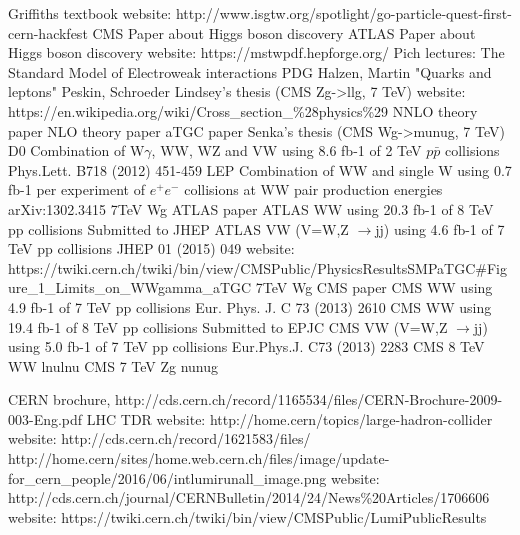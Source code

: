 \begin{thebibliography}{1}
 Griffiths textbook
 website: http://www.isgtw.org/spotlight/go-particle-quest-first-cern-hackfest
 CMS Paper about Higgs boson discovery
 ATLAS Paper about Higgs boson discovery
 website: https://mstwpdf.hepforge.org/
 Pich lectures: The Standard Model of Electroweak interactions
 PDG
 Halzen, Martin "Quarks and leptons"
 Peskin, Schroeder
 Lindsey's thesis (CMS Zg->llg, 7 TeV)
 website: https://en.wikipedia.org/wiki/Cross\_section\_\%28physics\%29
 NNLO theory paper
 NLO theory paper
 aTGC paper
 Senka's thesis (CMS Wg->munug, 7 TeV)
 D0 Combination of W$\gamma$, WW, WZ and VW using 8.6 fb-1 of 2 TeV $p\bar{p}$ collisions Phys.Lett. B718 (2012) 451-459 
 LEP Combination of WW and single W using 0.7 fb-1 per experiment of $e^+e^-$ collisions at WW pair production energies arXiv:1302.3415
 7TeV Wg ATLAS paper
 ATLAS WW using 20.3 fb-1 of 8 TeV pp collisions Submitted to JHEP
 ATLAS VW (V=W,Z $\rightarrow$jj) using 4.6 fb-1 of 7 TeV pp collisions JHEP 01 (2015) 049
 website: https://twiki.cern.ch/twiki/bin/view/CMSPublic/PhysicsResultsSMPaTGC\#Figure\_1\_Limits\_on\_WWgamma\_aTGC
 7TeV Wg CMS paper
 CMS WW using 4.9 fb-1 of 7 TeV pp collisions Eur. Phys. J. C 73 (2013) 2610
 CMS WW using 19.4 fb-1 of 8 TeV pp collisions Submitted to EPJC
 CMS VW (V=W,Z $\rightarrow$jj) using 5.0 fb-1 of 7 TeV pp collisions Eur.Phys.J. C73 (2013) 2283
 CMS 8 TeV WW lnulnu
 CMS 7 TeV Zg nunug



 CERN brochure, http://cds.cern.ch/record/1165534/files/CERN-Brochure-2009-003-Eng.pdf
 LHC TDR
 website: http://home.cern/topics/large-hadron-collider
 website: http://cds.cern.ch/record/1621583/files/
 http://home.cern/sites/home.web.cern.ch/files/image/update-for\_cern\_people/2016/06/intlumirunall\_image.png 
 website: http://cds.cern.ch/journal/CERNBulletin/2014/24/News\%20Articles/1706606
 website: https://twiki.cern.ch/twiki/bin/view/CMSPublic/LumiPublicResults


\end{thebibliography}
